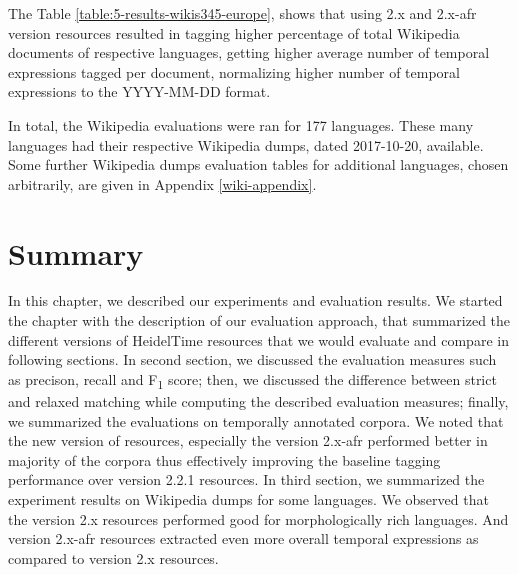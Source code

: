 The Table \ref{table:5-results-wikis345-europe}, shows that using 2.x and 2.x-afr version resources resulted in tagging higher percentage of total Wikipedia documents of respective languages, getting higher average number of temporal expressions tagged per document, normalizing higher number of temporal expressions to the YYYY-MM-DD format. 

In total, the Wikipedia evaluations were ran for 177 languages. These many languages had their respective Wikipedia dumps, dated 2017-10-20, available. Some further Wikipedia dumps evaluation tables for additional languages, chosen arbitrarily, are given in Appendix \ref{wiki-appendix}.

\section{Summary}
In this chapter, we described our experiments and evaluation results. We started the chapter with the description of our evaluation approach, that summarized the different versions of HeidelTime resources that we would evaluate and compare in following sections. In second section, we discussed the evaluation measures such as precison, recall and F\textsubscript{1} score; then, we discussed the difference between strict and relaxed matching while computing the described evaluation measures; finally, we summarized the evaluations on temporally annotated corpora. We noted that the new version of resources, especially the version 2.x-afr performed better in majority of the corpora thus effectively improving the baseline tagging performance over version 2.2.1 resources. In third section, we summarized the experiment results on Wikipedia dumps for some languages. We observed that the version 2.x resources performed good for morphologically rich languages. And version 2.x-afr resources extracted even more overall temporal expressions as compared to version 2.x resources. 
